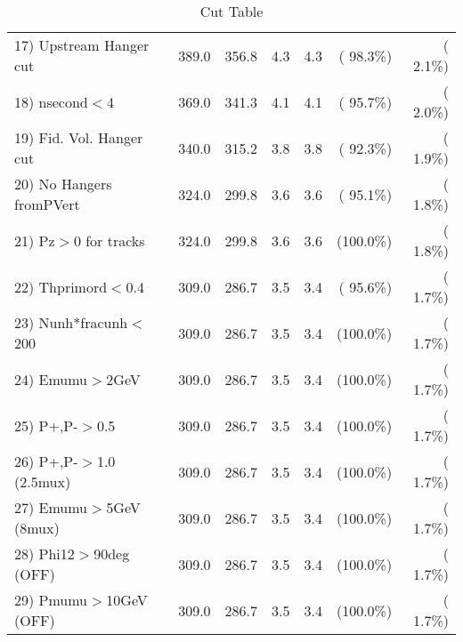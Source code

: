 \begin{table}[h!]
\begin{tabular}{||l||r|r|r|r|r|r||}
 17) Upstream Hanger cut  &        389.0 &        356.8 &          4.3 &          4.3 & ( 98.3\%) & (  2.1\%) \\
 18) nsecond$<$4          &        369.0 &        341.3 &          4.1 &          4.1 & ( 95.7\%) & (  2.0\%) \\
 19) Fid. Vol. Hanger cut &        340.0 &        315.2 &          3.8 &          3.8 & ( 92.3\%) & (  1.9\%) \\
 20) No Hangers fromPVert &        324.0 &        299.8 &          3.6 &          3.6 & ( 95.1\%) & (  1.8\%) \\
 21) Pz$>$0 for tracks    &        324.0 &        299.8 &          3.6 &          3.6 & (100.0\%) & (  1.8\%) \\
 22) Thprimord$<$0.4      &        309.0 &        286.7 &          3.5 &          3.4 & ( 95.6\%) & (  1.7\%) \\
 23) Nunh*fracunh$<$200   &        309.0 &        286.7 &          3.5 &          3.4 & (100.0\%) & (  1.7\%) \\
 24) Emumu$>$2GeV         &        309.0 &        286.7 &          3.5 &          3.4 & (100.0\%) & (  1.7\%) \\
 25) P+,P-$>$0.5          &        309.0 &        286.7 &          3.5 &          3.4 & (100.0\%) & (  1.7\%) \\
 26) P+,P-$>$1.0 (2.5mux) &        309.0 &        286.7 &          3.5 &          3.4 & (100.0\%) & (  1.7\%) \\
 27) Emumu$>$5GeV  (8mux) &        309.0 &        286.7 &          3.5 &          3.4 & (100.0\%) & (  1.7\%) \\
 28) Phi12$>$90deg  (OFF) &        309.0 &        286.7 &          3.5 &          3.4 & (100.0\%) & (  1.7\%) \\
 29) Pmumu$>$10GeV  (OFF) &        309.0 &        286.7 &          3.5 &          3.4 & (100.0\%) & (  1.7\%) \\
 \hline
 \hline
 \end{tabular}
 \caption{Cut Table           }
 \label{tab-cutcohjpsi-mumu_cohpip}
 \end{table}
